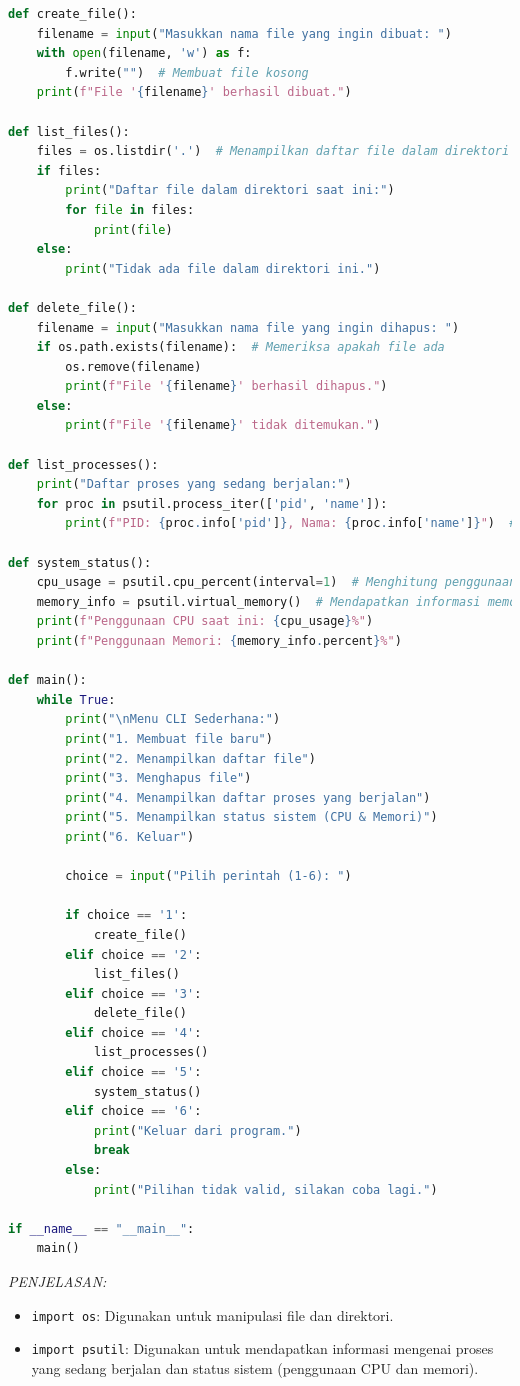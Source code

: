 \documentclass[12pt]{article}
\begin{document}
\begin{enumerate}
\begin{lstlisting}[language=Python, caption={Program CLI Sederhana}, label={lst:cli_program}, basicstyle=\ttfamily\small, keywordstyle=\color{blue}, commentstyle=\color{gray}]
def create_file():
    filename = input("Masukkan nama file yang ingin dibuat: ")
    with open(filename, 'w') as f:
        f.write("")  # Membuat file kosong
    print(f"File '{filename}' berhasil dibuat.")

def list_files():
    files = os.listdir('.')  # Menampilkan daftar file dalam direktori saat ini
    if files:
        print("Daftar file dalam direktori saat ini:")
        for file in files:
            print(file)
    else:
        print("Tidak ada file dalam direktori ini.")

def delete_file():
    filename = input("Masukkan nama file yang ingin dihapus: ")
    if os.path.exists(filename):  # Memeriksa apakah file ada
        os.remove(filename)
        print(f"File '{filename}' berhasil dihapus.")
    else:
        print(f"File '{filename}' tidak ditemukan.")

def list_processes():
    print("Daftar proses yang sedang berjalan:")
    for proc in psutil.process_iter(['pid', 'name']):
        print(f"PID: {proc.info['pid']}, Nama: {proc.info['name']}")  # Menampilkan PID dan nama proses

def system_status():
    cpu_usage = psutil.cpu_percent(interval=1)  # Menghitung penggunaan CPU
    memory_info = psutil.virtual_memory()  # Mendapatkan informasi memori
    print(f"Penggunaan CPU saat ini: {cpu_usage}%")
    print(f"Penggunaan Memori: {memory_info.percent}%")

def main():
    while True:
        print("\nMenu CLI Sederhana:")
        print("1. Membuat file baru")
        print("2. Menampilkan daftar file")
        print("3. Menghapus file")
        print("4. Menampilkan daftar proses yang berjalan")
        print("5. Menampilkan status sistem (CPU & Memori)")
        print("6. Keluar")
        
        choice = input("Pilih perintah (1-6): ")

        if choice == '1':
            create_file()
        elif choice == '2':
            list_files()
        elif choice == '3':
            delete_file()
        elif choice == '4':
            list_processes()
        elif choice == '5':
            system_status()
        elif choice == '6':
            print("Keluar dari program.")
            break
        else:
            print("Pilihan tidak valid, silakan coba lagi.")

if __name__ == "__main__":
    main()
\end{lstlisting}
\textit{PENJELASAN: }
\begin{itemize}
    \item \texttt{import os}: Digunakan untuk manipulasi file dan direktori.
    \item \texttt{import psutil}: Digunakan untuk mendapatkan informasi mengenai proses yang sedang berjalan dan status sistem (penggunaan CPU dan memori).
\end{itemize}


\end{enumerate}
\end{document}
